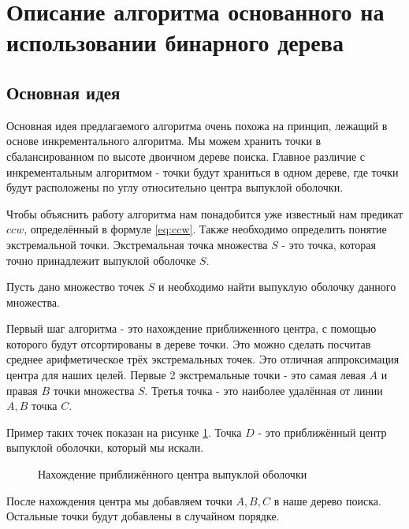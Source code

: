 \section{Описание алгоритма основанного на использовании бинарного дерева} \label{sect2_2}

\subsection{Основная идея} \label{subsect2_2_1}

Основная идея предлагаемого алгоритма очень похожа на принцип, лежащий в основе инкрементального алгоритма. Мы можем хранить точки в сбалансированном по высоте двоичном дереве поиска. Главное различие с инкрементальным алгоритмом - точки будут храниться в одном дереве, где точки будут расположены по углу относительно центра выпуклой оболочки.

Чтобы объяснить работу алгоритма нам понадобится уже известный нам предикат $ccw$, определённый в формуле \ref{eq:ccw}. Также необходимо определить понятие экстремальной точки. Экстремальная точка множества $S$ - это точка, которая точно принадлежит выпуклой оболочке $S$.

Пусть дано множество точек $S$ и необходимо найти выпуклую оболочку данного множества.

Первый шаг алгоритма - это нахождение приближенного центра, с помощью которого будут отсортированы в дереве точки. Это можно сделать посчитав среднее арифметическое трёх экстремальных точек. Это отличная аппроксимация центра для наших целей. Первые 2 экстремальные точки -  это самая левая $A$ и правая $B$ точки множества $S$. Третья точка - это наиболее удалённая от линии $A, B$ точка $C$.

Пример таких точек показан на рисунке \ref{img:my_extreme_points}. Точка $D$ - это приближённый центр выпуклой оболочки, который мы искали.

\begin{figure}[H]
	{\centering
		\hfill
		\subbottom[\label{img:my_extreme_points_1}]{%
			}
		\hfill
		\subbottom[\label{img:my_extreme_points_2}]{%
			}
		\hfill
	}
	\caption{Нахождение приближённого центра выпуклой оболочки}
	\label{img:my_extreme_points}
\end{figure}

После нахождения центра мы добавляем точки $A, B, C$ в наше дерево поиска. Остальные точки будут добавлены в случайном порядке.

